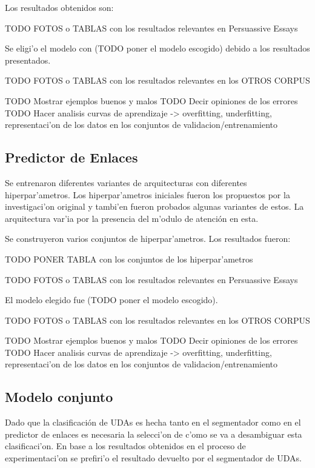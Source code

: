 Los resultados obtenidos son:

TODO FOTOS o TABLAS con los resultados relevantes en Persuassive Essays

Se eligi'o el modelo con (TODO poner el modelo escogido) debido a los resultados presentados.

TODO FOTOS o TABLAS con los resultados relevantes en los OTROS CORPUS

TODO Mostrar ejemplos buenos y malos
TODO Decir opiniones de los errores
TODO Hacer analisis curvas de aprendizaje -> overfitting, underfitting, representaci'on de los datos en los conjuntos de validacion/entrenamiento

\subsection{Predictor de Enlaces}

Se entrenaron diferentes variantes de arquitecturas con diferentes hiperpar'ametros. Los hiperpar'ametros
iniciales fueron los propuestos por la investigaci'on original y tambi'en fueron probados algunas variantes 
de estos. La arquitectura var'ia por la presencia del m'odulo de atención en esta.

Se construyeron varios conjuntos de hiperpar'ametros. Los resultados fueron:

TODO PONER TABLA con los conjuntos de los hiperpar'ametros

TODO FOTOS o TABLAS con los resultados relevantes en Persuassive Essays 

El modelo elegido fue (TODO poner el modelo escogido).

TODO FOTOS o TABLAS con los resultados relevantes en los OTROS CORPUS

TODO Mostrar ejemplos buenos y malos
TODO Decir opiniones de los errores
TODO Hacer analisis curvas de aprendizaje -> overfitting, underfitting, representaci'on de los datos en los conjuntos de validacion/entrenamiento

\subsection{Modelo conjunto}

Dado que la clasificación de UDAs es hecha tanto en el segmentador como en el predictor de enlaces es necesaria 
la selecci'on de c'omo se va a desambiguar esta clasificaci'on. En base a los resultados obtenidos en el proceso
de experimentaci'on se prefiri'o el resultado devuelto por el segmentador de UDAs.

